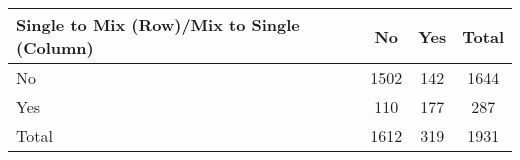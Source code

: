 {
\def\sym#1{\ifmmode^{#1}\else\(^{#1}\)\fi}
\begin{tabular}{l*{3}{c}}
\toprule
Single to Mix (Row)/Mix to Single (Column)&          No&         Yes&       Total\\
\midrule
No          &        1502&         142&        1644\\
Yes         &         110&         177&         287\\
Total       &        1612&         319&        1931\\
\bottomrule
\end{tabular}
}
